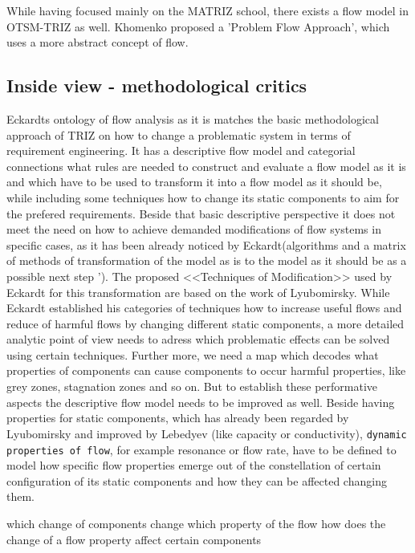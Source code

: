 \documentclass[a4paper,11pt]{article}
\begin{document}
        While having focused mainly on the MATRIZ school, there exists a flow model in OTSM-TRIZ as well. Khomenko proposed a 'Problem Flow Approach',
        which uses a more abstract concept of flow. 

        

        \subsection{Inside view - methodological critics}
        Eckardts ontology of flow analysis as it is matches the basic methodological approach of TRIZ on how to change a problematic system in terms 
        of requirement engineering. It has a descriptive flow model and categorial connections what rules are needed to construct and evaluate a 
        flow model as it is and which have to be used to transform it into a flow model as it should be, while including some techniques how to change
        its static components to aim for the prefered requirements. Beside that basic descriptive perspective it does not meet the need on how
        to achieve demanded modifications of flow systems in specific cases, as it has been already noticed by Eckardt(algorithms and a matrix
        of methods of transformation of the model as is to the model as it should be as a possible next step \cite{Eckardt2020}').
        The proposed <<Techniques of Modification>> used by Eckardt for this transformation are based on the work of Lyubomirsky. While Eckardt established
        his categories of techniques how to increase useful flows and reduce of harmful flows by changing different static components, a more detailed analytic 
        point of view needs to adress which problematic effects can be solved using certain techniques. Further more, we need a map which decodes what
        properties of components can cause components to occur harmful properties, like grey zones, stagnation zones and so on. 
        But to establish these performative aspects the descriptive flow model needs to be improved as well. 
        Beside having properties for static components, which has already been regarded by Lyubomirsky and improved by Lebedyev (like capacity or conductivity),
        \texttt{dynamic properties of flow}, for example resonance or flow rate, have to be
        defined to model how specific flow properties emerge out of the constellation of certain configuration of its static components and how they can be affected
        changing them.

        which change of components change which property of the flow
        how does the change of a flow property affect certain components
        
\end{document}
